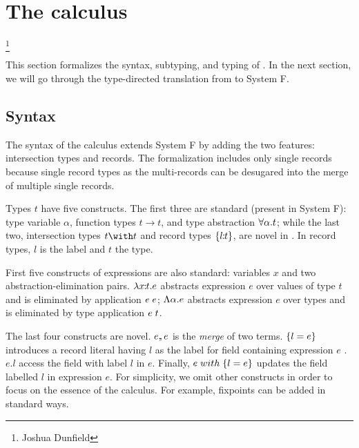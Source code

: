 \section{The \name calculus}

\footnote{Joshua Dunfield}

This section formalizes the syntax, subtyping, and typing of \name. In the next
section, we will go through the type-directed translation from \name to System
F.


\subsection{Syntax}

The syntax of the \name calculus extends System F by adding the two features:
intersection types and records. The formalization includes only single records
because single record types as the multi-records can be desugared into the merge
of multiple single records.



Types $ t $ have five constructs. The first three are standard (present in
System F): type variable $ \alpha $, function types $ t \to t $, and type
abstraction $ \forall \alpha. t $; while the last two, intersection types
$ t \with t $ and record types $ \{ l \!\!:\!\! t \} $, are novel in \Name. In
record types, $ l $ is the label and $ t $ the type.

First five constructs of expressions are also standard: variables $ x $ and two
abstraction-elimination pairs. $ \lambda x \!\!:\!\! t. e $ abstracts expression
$ e $ over values of type $ t $ and is eliminated by application $ e \; e $;
$ \Lambda \alpha. e $ abstracts expression $ e $ over types and is eliminated by
type application $ e \; t $.

The last four constructs are novel. $ e ,\!\!, e $ is the \emph{merge} of two
terms. $ \{ l = e \} $ introduces a record literal having $ l $ as the
label for field containing expression $ e $ . $ e.l $ access the field with
label $ l $ in $ e $. Finally, $ e \; with \; \{ l = e \} $ updates the field
labelled $ l $ in expression $ e $. For simplicity, we omit other constructs in
order to focus on the essence of the calculus. For example, fixpoints can be
added in standard ways.


